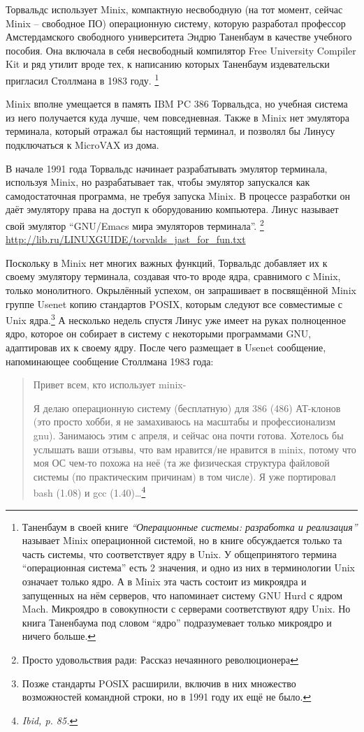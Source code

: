 Торвальдс использует Minix, компактную несвободную (на тот момент, сейчас Minix -- свободное ПО) операционную систему, которую разработал профессор Амстердамского свободного университета Эндрю Таненбаум в качестве учебного пособия. Она включала в себя несвободный компилятор Free University Compiler Kit и ряд утилит вроде тех, к написанию которых Таненбаум издевательски пригласил Столлмана в 1983 году. \footnote{Таненбаум в своей книге \textit{\enquote{Операционные системы: разработка и реализация}} называет Minix операционной системой, но в книге обсуждается только та часть системы, что соответствует ядру в Unix. У общепринятого термина \enquote{операционная система} есть 2 значения, и одно из них в терминологии Unix означает только ядро. А в Minix эта часть состоит из микроядра и запущенных на нём серверов, что напоминает систему GNU Hurd с ядром Mach. Микроядро в совокупности с серверами соответствуют ядру Unix. Но книга Таненбаума под словом \enquote{ядро} подразумевает только микроядро и ничего больше.}

Minix вполне умещается в память IBM PC 386 Торвальдса, но учебная система из него получается куда лучше, чем повседневная. Также в Minix нет эмулятора терминала, который отражал бы настоящий терминал, и позволял бы Линусу подключаться к MicroVAX из дома.

В начале 1991 года Торвальдс начинает разрабатывать эмулятор терминала, используя Minix, но разрабатывает так, чтобы эмулятор запускался как самодостаточная программа, не требуя запуска Minix. В процессе разработки он даёт эмулятору права на доступ к оборудованию компьютера. Линус называет свой эмулятор \enquote{GNU/Emacs мира эмуляторов терминала}. \footnote{Просто удовольствия ради: Рассказ нечаянного революционера} \url{http://lib.ru/LINUXGUIDE/torvalds_jast_for_fun.txt}

Поскольку в Minix нет многих важных функций, Торвальдс добавляет их к своему эмулятору терминала, создавая что-то вроде ядра, сравнимого с Minix, только монолитного. Окрылённый успехом, он запрашивает в посвящённой Minix группе Usenet копию стандартов POSIX, которым следуют все совместимые с Unix ядра.\footnote{Позже стандарты POSIX расширили, включив в них множество возможностей командной строки, но в 1991 году их ещё не было.} А несколько недель спустя Линус уже имеет на руках полноценное ядро, которое он собирает в систему с некоторыми программами GNU, адаптировав их к своему ядру. После чего размещает в Usenet сообщение, напоминающее сообщение Столлмана 1983 года:

\begin{quote}
Привет всем, кто использует minix-

Я делаю операционную систему (бесплатную) для 386 (486) АТ-клонов (это просто хобби, я не замахиваюсь на масштабы и профессионализм gnu). Занимаюсь этим с апреля, и сейчас она почти готова. Хотелось бы услышать ваши отзывы, что вам нравится/не нравится в minix, потому что моя ОС чем-то похожа на неё (та же физическая структура файловой системы (по практическим причинам) в том числе). Я уже портировал bash (1.08) и gcc (1.40)\ldots\footnote{\textit{Ibid, p. 85.}}
\end{quote}

